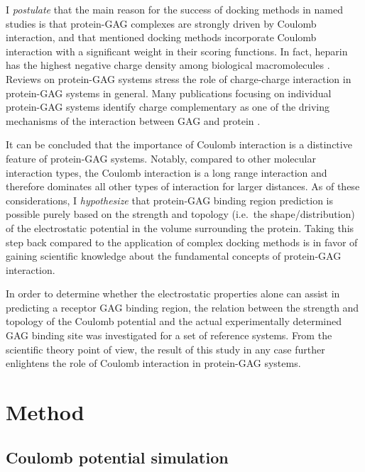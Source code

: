 I \textit{postulate} that the main reason for the success of docking methods in
named studies is that protein-GAG complexes are strongly driven by Coulomb
interaction, and that mentioned docking methods incorporate Coulomb interaction
with a significant weight in their scoring functions. In fact, heparin has the
highest negative charge density among biological macromolecules
\cite{capila_linhardt_hep_prot_2002}. Reviews on protein-GAG systems
\cite{essentials_glycobiology_protgags_2009,gandhi_structure_2008} stress
the role of charge-charge interaction in protein-GAG systems in general. Many
publications focusing on individual protein-GAG systems identify charge
complementary as one of the driving mechanisms of the interaction between GAG
and protein
\cite{gandhi_bmp_heparin_binding_sites_2012,faham_heparin_1996,%
pichert_characterization_2012,rogers_gag_prot_prot_2011}.

It can be concluded that the importance of Coulomb interaction is a distinctive
feature of protein-GAG systems. Notably, compared to other molecular interaction
types, the Coulomb interaction is a long range interaction and therefore
dominates all other types of interaction for larger distances. As of these
considerations, I \textit{hypothesize} that protein-GAG binding region
prediction is possible purely based on the strength and topology (i.e.\ the
shape/distribution) of the electrostatic potential in the volume surrounding the
protein. Taking this step back compared to the application of complex docking
methods is in favor of gaining scientific knowledge about the fundamental
concepts of protein-GAG interaction.

In order to determine whether the electrostatic properties alone can assist in
predicting a receptor GAG binding region, the relation between the strength and
topology of the Coulomb potential and the actual experimentally determined GAG
binding site was investigated for a set of reference systems. From the
scientific theory point of view, the result of this study in any case further
enlightens the role of Coulomb interaction in protein-GAG systems.


\section{Method}

\subsection{Coulomb potential simulation}

